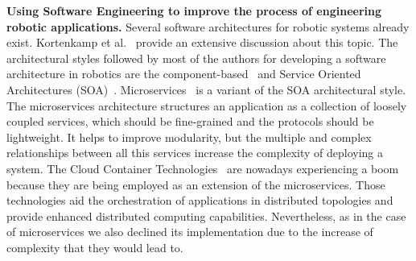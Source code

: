 \textbf{Using Software Engineering to improve the process of engineering robotic applications.}
Several software architectures for robotic systems already exist. 
Kortenkamp et al.~\cite{Kortenkamp2008} provide an extensive discussion about this topic. 
The architectural styles followed by most of the authors for developing a software architecture in robotics are the component-based~\cite{Bruyninckx2013,braberman} and Service Oriented Architectures (SOA)~\cite{Fluckiger2014}.
Microservices~\cite{Newman2015} is a variant of the SOA architectural style. 
The microservices architecture structures an application as a collection of loosely coupled services, which should be fine-grained and the protocols should be lightweight. 
It helps to improve modularity, but the multiple and complex relationships between all this services %
increase the complexity of deploying a system. %
The Cloud Container Technologies~\cite{Pahl2017} are nowadays experiencing a boom because they are being employed as an extension of the microservices. 
Those technologies aid the orchestration of applications in distributed topologies and provide enhanced distributed computing capabilities. %
Nevertheless, as in the case of microservices we also declined its implementation due to the increase of complexity that they would lead to.

